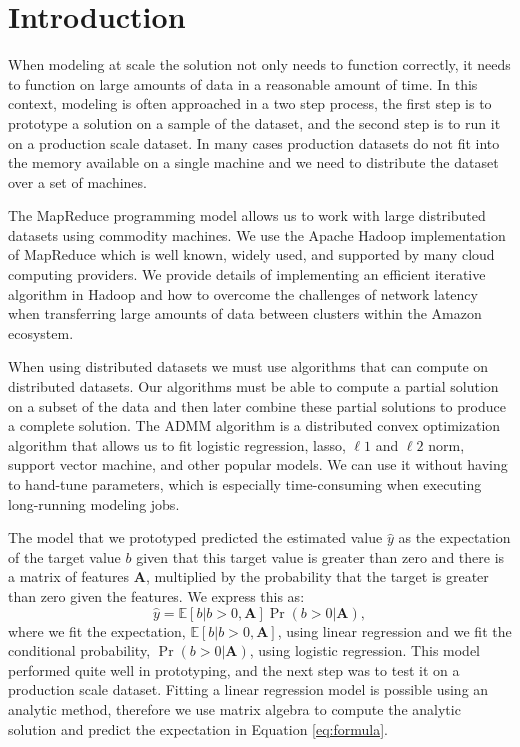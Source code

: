 \documentclass[10pt, conference, compsocconf]{IEEEtran}
\begin{document}
\section{Introduction}
When modeling at scale the solution not only needs to function correctly, it needs to function on large amounts of data in a reasonable amount of time.  In this context, modeling is often approached in a two step process, the first step is to prototype a solution on a sample of the dataset, and the second step is to run it on a production scale dataset.  In many cases production datasets do not fit into the memory available on a single machine and we need to distribute the dataset over a set of machines.

The MapReduce programming model \cite{dean2004} allows us to work with large distributed datasets using commodity machines.  We use the Apache Hadoop \cite{white2009} implementation of MapReduce which is well known, widely used, and supported by many cloud computing providers.  We provide details of implementing an efficient iterative algorithm in Hadoop and how to overcome the challenges of network latency when transferring large amounts of data between clusters within the Amazon ecosystem. 

When using distributed datasets we must use algorithms that can compute on distributed datasets.  Our algorithms must be able to compute a partial solution on a subset of the data and then later combine these partial solutions to produce a complete solution.  The ADMM algorithm is a distributed convex optimization algorithm that allows us to fit logistic regression, lasso, $\ell1$ and $\ell2$ norm, support vector machine, and other popular models.  We can use it without having to hand-tune parameters, which is especially time-consuming when executing long-running modeling jobs.

The model that we prototyped predicted the estimated value $\hat{y}$ as the expectation of the target value $b$ given that this target value is greater than zero and there is a matrix of features $\mathbf{A}$, multiplied by the probability that the target is greater than zero given the features.  We express this as:
\begin{equation}
\hat{y} = \mathbb{E}[b|b>0,\mathbf{A}]\Pr(b>0|\mathbf{A}),
\label{eq:formula}
\end{equation}
where we fit the expectation, $\mathbb{E}[b|b>0,\mathbf{A}]$, using linear regression and we fit the conditional probability, $\Pr(b>0|\mathbf{A})$, using logistic regression.  This model performed quite well in prototyping, and the next step was to test it on a production scale dataset.  Fitting a linear regression model is possible using an analytic method, therefore we use matrix algebra to compute the analytic solution and predict the expectation in Equation \ref{eq:formula}.
\end{document}
